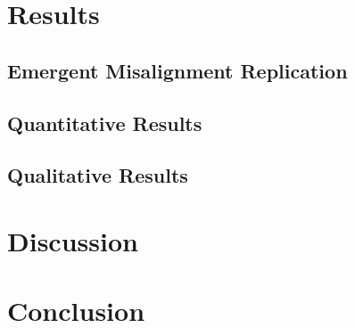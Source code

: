 \documentclass[10pt,onecolumn,letterpaper]{article}
\begin{document}
\section{Results}
\subsection{Emergent Misalignment Replication}
\subsection{Quantitative Results}
\subsection{Qualitative Results}
\section{Discussion}
\section{Conclusion}



{\small


}
\end{document}
